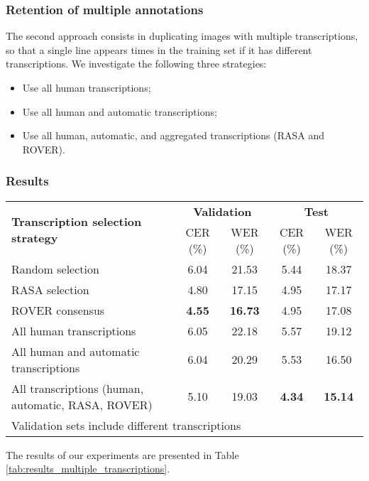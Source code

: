 \documentclass[sigconf]{acmart}
\begin{document}
\subsubsection{Retention of multiple annotations} 
The second approach consists in duplicating images with multiple transcriptions, so that a single line appears  times in the training set if it has  different transcriptions. We investigate the following three strategies:

\begin{itemize}
    \item Use all human transcriptions;
    \item Use all human and automatic transcriptions; 
    \item Use all human, automatic, and aggregated transcriptions (RASA and ROVER).
\end{itemize}

\subsubsection{Results} 

\begin{table*}[thb]
    \centering
    \caption{Evaluation results for experiments on transcription selection. The same PyLaia architecture is trained using different transcriptions}
    \label{tab:results_multiple_transcriptions}
    \begin{tabular}{l|cccc}
    \toprule
        \multirow{2}{*}{\bf Transcription selection strategy} & \multicolumn{2}{c}{\bf Validation\footnotemark[1]} & \multicolumn{2}{c}{\bf Test}\\
        & CER (\%) & WER (\%)  & CER (\%) & WER (\%) \\
    \midrule
        Random selection  & 6.04 & 21.53 & 5.44 & 18.37\\
        RASA selection & 4.80 & 17.15 & 4.95 & 17.17 \\
        ROVER consensus & \textbf{4.55} & \textbf{16.73} & 4.95 & 17.08 \\
        All human transcriptions & 6.05  & 22.18 & 5.57 & 19.12 \\
        All human and automatic transcriptions & 6.04 & 20.29 & 5.53 & 16.50 \\
        All transcriptions (human, automatic, RASA, ROVER) & 5.10 & 19.03 & \textbf{4.34} & \textbf{15.14}  \\
    \bottomrule
    \multicolumn{5}{l}{\footnotemark[1] Validation sets include different transcriptions} \\
    \end{tabular}
\end{table*}
The results of our experiments are presented in Table \ref{tab:results_multiple_transcriptions}.
\end{document}
